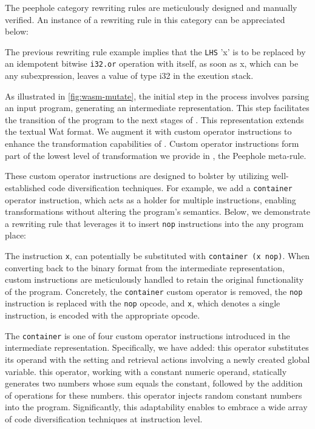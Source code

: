 The peephole category rewriting rules are meticulously designed and manually verified. 
An instance of a rewriting rule in this category can be appreciated below:



The previous rewriting rule example implies that the \texttt{LHS} 'x' is to be replaced by an idempotent bitwise \texttt{i32.or} operation with itself,  as soon as x, which can be any subexpression, leaves a value of type i32 in the exeution stack.

\label{custom}

As illustrated in \autoref{fig:wasm-mutate}, the initial step in the process involves parsing an input \Wasm program, generating an intermediate representation. 
This step facilitates the transition of the \Wasm program to the next stages of \tool. 
This representation extends the textual Wat format.
We augment it with custom operator instructions to enhance the transformation capabilities of \tool \cite{webassembly_runtime}.
Custom operator instructions form part of the lowest level of transformation we provide in \tool, the Peephole meta-rule.

These custom operator instructions are designed to bolster \tool by utilizing well-established code diversification techniques. 
For example, we add a \texttt{container} operator instruction, which acts as a holder for multiple instructions, enabling transformations without altering the program's semantics. 
Below, we demonstrate a rewriting rule that leverages it to insert \texttt{nop} instructions into the any \Wasm program place:



The instruction \texttt{x}, can potentially be substituted with \texttt{container (x nop)}. 
When converting back to the \Wasm binary format from the intermediate representation, custom instructions are meticulously handled to retain the original functionality of the \Wasm program. 
Concretely, the \texttt{container} custom operator is removed, the \texttt{nop} instruction is replaced with the \texttt{nop} opcode, and \texttt{x}, which denotes a single instruction, is encoded with the appropriate opcode.

The \texttt{container} is one of four custom operator instructions introduced in the \tool intermediate representation. 
Specifically, we have added:
 this operator substitutes its operand with the setting and retrieval actions involving a newly created global variable.
 this operator, working with a constant numeric operand, statically generates two numbers whose sum equals the constant, followed by the addition of operations for these numbers.
 this operator injects random constant numbers into the program.
Significantly, this adaptability enables \tool to embrace a wide array of code diversification techniques at instruction level.


